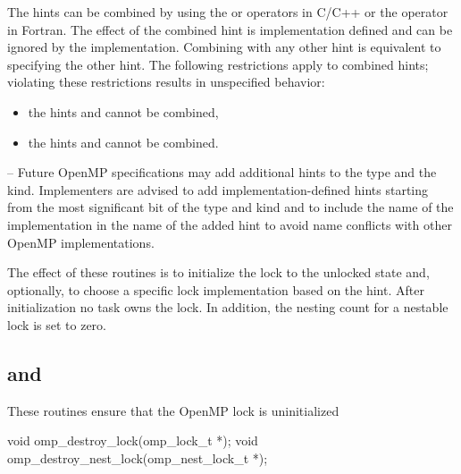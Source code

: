 The hints can be combined by using the \code{+} or \code{|} operators in C/C++ or the \code{+} operator in Fortran.  
The effect of the combined hint is implementation defined and can be ignored by the implementation.
Combining  with any other hint is equivalent to specifying the other hint.
The following restrictions apply to combined hints; violating these 
restrictions results in unspecified behavior:
\begin{itemize}
\item the hints  and  cannot be combined,
\item the hints  and  cannot be combined.
\end{itemize}


\notestart
\noteheader – Future OpenMP specifications may add additional hints to the 
 type and the  kind.  
Implementers are advised to add implementation-defined hints starting from 
the most significant bit of the  type and
 kind and to include the name of the 
implementation in the name of the added hint to avoid name conflicts 
with other OpenMP implementations.
\noteend


\effect
The effect of these routines is to initialize the lock to the unlocked state and, optionally, to choose a specific lock implementation based on the hint. 
After initialization no task owns the lock. In addition, the nesting count for a nestable lock is set to zero.




\subsection[\code{omp\_destroy\_lock} and \code{omp\_destroy\_nest\_lock}]{ and\\ }
\label{subsec:omp_destroy_lock and omp_destroy_nest_lock}
\summary
These routines ensure that the OpenMP lock is uninitialized

\format
\ccppspecificstart
\begin{boxedcode}
void omp\_destroy\_lock(omp\_lock\_t *);
void omp\_destroy\_nest\_lock(omp\_nest\_lock\_t *);
\end{boxedcode}
\ccppspecificend

